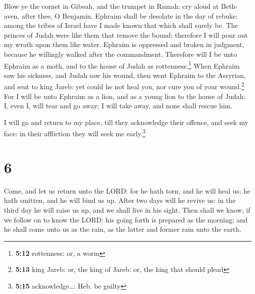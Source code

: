 Blow ye the cornet in Gibeah, and the trumpet in Ramah:
cry aloud at Beth-aven, after thee, O Benjamin.  Ephraim
shall be desolate in the day of rebuke: among the tribes of Israel have
I made known that which shall surely be.  The princes of
Judah were like them that remove the bound: therefore I will pour out my
wrath upon them like water.  Ephraim is oppressed and
broken in judgment, because he willingly walked after the commandment.
 Therefore will I be unto Ephraim as a moth, and to the
house of Judah as rottenness.\footnote{\textbf{5:12} rottenness: or, a
  worm}  When Ephraim saw his sickness, and Judah saw his
wound, then went Ephraim to the Assyrian, and sent to king Jareb: yet
could he not heal you, nor cure you of your wound.\footnote{\textbf{5:13}
  king Jareb: or, the king of Jareb: or, the king that should plead}
 For I will be unto Ephraim as a lion, and as a young
lion to the house of Judah: I, even I, will tear and go away; I will
take away, and none shall rescue him.

 I will go and return to my place, till they acknowledge
their offence, and seek my face: in their affliction they will seek me
early.\footnote{\textbf{5:15} acknowledge\ldots: Heb. be guilty}

\hypertarget{section-5}{%
\section{6}\label{section-5}}

 Come, and let us return unto the LORD: for he hath torn,
and he will heal us; he hath smitten, and he will bind us up.
 After two days will he revive us: in the third day he
will raise us up, and we shall live in his sight.  Then
shall we know, if we follow on to know the LORD: his going forth is
prepared as the morning; and he shall come unto us as the rain, as the
latter and former rain unto the earth.

